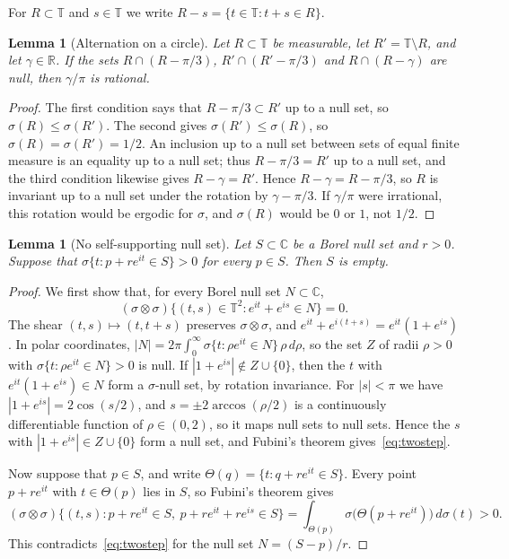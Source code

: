 \documentclass[10pt]{article}
\newtheorem{lem}[thm]{Lemma}
\theoremstyle{remark}
\newcommand{\C}{\mathbb C}
\newcommand{\R}{\mathbb R}
\newcommand{\T}{\mathbb T}
\begin{document}
For $R\subset\T$ and $s\in\T$ we write $R-s=\{t\in\T:t+s\in R\}$.

\begin{lem}[Alternation on a circle]\label{lem:alternation}
Let $R\subset\T$ be measurable, let $R'=\T\setminus R$, and let $\gamma\in\R$. If the sets $R\cap(R-\pi/3)$, $R'\cap(R'-\pi/3)$ and $R\cap(R-\gamma)$ are null, then $\gamma/\pi$ is rational.
\end{lem}

\begin{proof}
The first condition says that $R-\pi/3\subset R'$ up to a null set, so $\sigma(R)\le\sigma(R')$. The second gives $\sigma(R')\le\sigma(R)$, so $\sigma(R)=\sigma(R')=1/2$. An inclusion up to a null set between sets of equal finite measure is an equality up to a null set; thus $R-\pi/3=R'$ up to a null set, and the third condition likewise gives $R-\gamma=R'$. Hence $R-\gamma=R-\pi/3$, so $R$ is invariant up to a null set under the rotation by $\gamma-\pi/3$. If $\gamma/\pi$ were irrational, this rotation would be ergodic for $\sigma$, and $\sigma(R)$ would be $0$ or $1$, not $1/2$.
\end{proof}

\begin{lem}[No self-supporting null set]\label{lem:selfsupport}
Let $S\subset\C$ be a Borel null set and $r>0$. Suppose that $\sigma\{t:p+re^{it}\in S\}>0$ for every $p\in S$. Then $S$ is empty.
\end{lem}

\begin{proof}
We first show that, for every Borel null set $N\subset\C$,
\begin{equation}\label{eq:twostep}
 (\sigma\otimes\sigma)\{(t,s)\in\T^2:e^{it}+e^{is}\in N\}=0.
\end{equation}
The shear $(t,s)\mapsto(t,t+s)$ preserves $\sigma\otimes\sigma$, and $e^{it}+e^{i(t+s)}=e^{it}(1+e^{is})$. In polar coordinates, $|N|=2\pi\int_0^\infty\sigma\{t:\rho e^{it}\in N\}\,\rho\,d\rho$, so the set $Z$ of radii $\rho>0$ with $\sigma\{t:\rho e^{it}\in N\}>0$ is null. If $|1+e^{is}|\notin Z\cup\{0\}$, then the $t$ with $e^{it}(1+e^{is})\in N$ form a $\sigma$-null set, by rotation invariance. For $|s|<\pi$ we have $|1+e^{is}|=2\cos(s/2)$, and $s=\pm2\arccos(\rho/2)$ is a continuously differentiable function of $\rho\in(0,2)$, so it maps null sets to null sets. Hence the $s$ with $|1+e^{is}|\in Z\cup\{0\}$ form a null set, and Fubini's theorem gives~\eqref{eq:twostep}.

Now suppose that $p\in S$, and write $\Theta(q)=\{t:q+re^{it}\in S\}$. Every point $p+re^{it}$ with $t\in\Theta(p)$ lies in $S$, so Fubini's theorem gives
\[
 (\sigma\otimes\sigma)\{(t,s):p+re^{it}\in S,\ p+re^{it}+re^{is}\in S\}
 =\int_{\Theta(p)}\sigma\bigl(\Theta(p+re^{it})\bigr)\,d\sigma(t)>0.
\]
This contradicts~\eqref{eq:twostep} for the null set $N=(S-p)/r$.
\end{proof}
\end{document}
